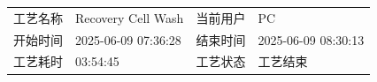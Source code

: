 \documentclass[UTF8,10pt,a4paper,fontset=fandol]{ctexart}
\newcommand{\fieldvalue}[1]{#1}
\begin{document}
\vspace{0.5em}

\begin{tabularx}{\textwidth}{@{}lX lX@{}}
工艺名称 &
\fieldvalue{Recovery Cell Wash} &
当前用户 &
\fieldvalue{PC} \\

开始时间 &
\fieldvalue{2025-06-09 07:36:28} &
结束时间 &
\fieldvalue{2025-06-09 08:30:13} \\

工艺耗时 &
\fieldvalue{03:54:45} &
工艺状态 &
\fieldvalue{工艺结束}
\end{tabularx}

\vspace{0.5em}
\end{document}

